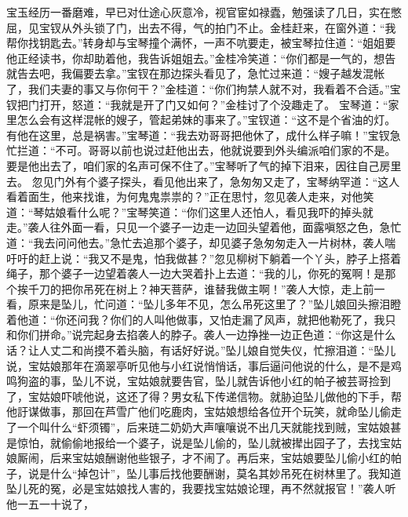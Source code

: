 \documentclass[12pt,oneside]{book}
\begin{document}
宝玉经历一番磨难，早已对仕途心灰意冷，视官宦如禄蠹，勉强读了几日，实在憋屈，见宝钗从外头锁了门，出去不得，气的拍门不止。金桂赶来，在窗外道：“我帮你找钥匙去。”转身却与宝琴撞个满怀，一声不吭要走，被宝琴拉住道：“姐姐要他正经读书，你却助着他，我告诉姐姐去。”金桂冷笑道：“你们都是一气的，想告就告去吧，我偏要去拿。”宝钗在那边探头看见了，急忙过来道：“嫂子越发混帐了，我们夫妻的事又与你何干？”金桂道：“你们拘禁人就不对，我看着不合适。”宝钗把门打开，怒道：“我就是开了门又如何？”金桂讨了个没趣走了。
宝琴道：“家里怎么会有这样混帐的嫂子，管起弟妹的事来了。”宝钗道：“这不是个省油的灯。有他在这里，总是祸害。”宝琴道：“我去劝哥哥把他休了，成什么样子嘛！”宝钗急忙拦道：“不可。哥哥以前也说过赶他出去，他就说要到外头编派咱们家的不是。要是他出去了，咱们家的名声可保不住了。”宝琴听了气的掉下泪来，因往自己房里去。
忽见门外有个婆子探头，看见他出来了，急匆匆又走了，宝琴纳罕道：“这人看着面生，他来找谁，为何鬼鬼祟祟的？”正在思忖，忽见袭人走来，对他笑道：“琴姑娘看什么呢？”宝琴笑道：“你们这里人还怕人，看见我吓的掉头就走。”袭人往外面一看，只见一个婆子一边走一边回头望着他，面露嗔怒之色，急忙道：“我去问问他去。”急忙去追那个婆子，却见婆子急匆匆走入一片树林，袭人喘吁吁的赶上说：“我又不是鬼，怕我做甚？”忽见柳树下躺着一个丫头，脖子上搭着绳子，那个婆子一边望着袭人一边大哭着扑上去道：“我的儿，你死的冤啊！是那个挨千刀的把你吊死在树上？神天菩萨，谁替我做主啊！”袭人大惊，走上前一看，原来是坠儿，忙问道：“坠儿多年不见，怎么吊死这里了？”坠儿娘回头擦泪瞪着他道：“你还问我？你们的人叫他做事，又怕走漏了风声，就把他勒死了，我只和你们拼命。”说完起身去掐袭人的脖子。袭人一边挣挫一边正色道：“你这是什么话？让人丈二和尚摸不着头脑，有话好好说。”坠儿娘自觉失仪，忙擦泪道：“坠儿说，宝姑娘那年在滴翠亭听见他与小红说悄悄话，事后逼问他说的什么，是不是鸡鸣狗盗的事，坠儿不说，宝姑娘就要告官，坠儿就告诉他小红的帕子被芸哥捡到了，宝姑娘吓唬他说，这还了得？男女私下传递信物。就胁迫坠儿做他的下手，帮他訏谋做事，那回在芦雪广他们吃鹿肉，宝姑娘想给各位开个玩笑，就命坠儿偷走了一个叫什么“虾须镯”，后来琏二奶奶大声嚷嚷说不出几天就能找到贼，宝姑娘甚是惊怕，就偷偷地报给一个婆子，说是坠儿偷的，坠儿就被撵出园子了，去找宝姑娘厮闹，后来宝姑娘酬谢他些银子，才不闹了。再后来，宝姑娘要坠儿偷小红的帕子，说是什么“掉包计”，坠儿事后找他要酬谢，莫名其妙吊死在树林里了。我知道坠儿死的冤，必是宝姑娘找人害的，我要找宝姑娘论理，再不然就报官！”袭人听他一五一十说了， 
\end{document}
